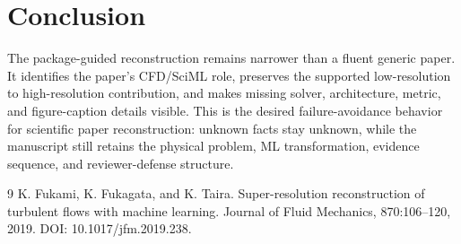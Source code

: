 \documentclass[11pt]{article}
\begin{document}
\section{Conclusion}
The package-guided reconstruction remains narrower than a fluent generic paper. It identifies the paper's CFD/SciML role, preserves the supported low-resolution to high-resolution contribution, and makes missing solver, architecture, metric, and figure-caption details visible. This is the desired failure-avoidance behavior for scientific paper reconstruction: unknown facts stay unknown, while the manuscript still retains the physical problem, ML transformation, evidence sequence, and reviewer-defense structure.

\begin{thebibliography}{9}
K. Fukami, K. Fukagata, and K. Taira.
\newblock Super-resolution reconstruction of turbulent flows with machine learning.
\newblock Journal of Fluid Mechanics, 870:106--120, 2019.
\newblock DOI: 10.1017/jfm.2019.238.
\end{thebibliography}
\end{document}
